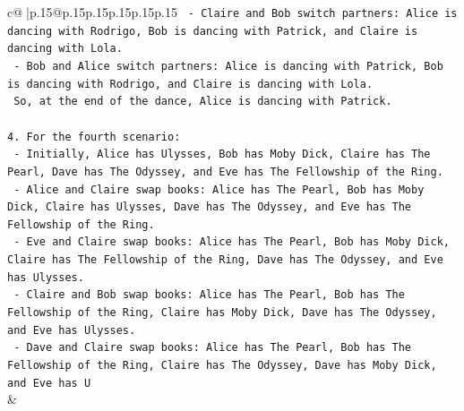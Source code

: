 \documentclass{article}
\begin{document}
{\begin{supertabular}{c@{$\;$}|p{.15\linewidth}@{}p{.15\linewidth}p{.15\linewidth}p{.15\linewidth}p{.15\linewidth}p{.15\linewidth}}
{{{\texttt{   {-} Claire and Bob switch partners: Alice is dancing with Rodrigo, Bob is dancing with Patrick, and Claire is dancing with Lola.} \\
\texttt{   {-} Bob and Alice switch partners: Alice is dancing with Patrick, Bob is dancing with Rodrigo, and Claire is dancing with Lola.} \\
\texttt{   So, at the end of the dance, Alice is dancing with Patrick.} \\
\\ 
\texttt{4. For the fourth scenario:} \\
\texttt{   {-} Initially, Alice has Ulysses, Bob has Moby Dick, Claire has The Pearl, Dave has The Odyssey, and Eve has The Fellowship of the Ring.} \\
\texttt{   {-} Alice and Claire swap books: Alice has The Pearl, Bob has Moby Dick, Claire has Ulysses, Dave has The Odyssey, and Eve has The Fellowship of the Ring.} \\
\texttt{   {-} Eve and Claire swap books: Alice has The Pearl, Bob has Moby Dick, Claire has The Fellowship of the Ring, Dave has The Odyssey, and Eve has Ulysses.} \\
\texttt{   {-} Claire and Bob swap books: Alice has The Pearl, Bob has The Fellowship of the Ring, Claire has Moby Dick, Dave has The Odyssey, and Eve has Ulysses.} \\
\texttt{   {-} Dave and Claire swap books: Alice has The Pearl, Bob has The Fellowship of the Ring, Claire has The Odyssey, Dave has Moby Dick, and Eve has U} \\
            }
        }
    }
    & \\ \\


\end{supertabular}}
\end{document}
